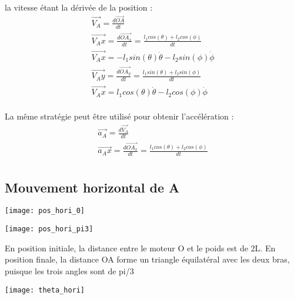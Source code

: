 \documentclass{udes_rapport} %
\begin{document}
la vitesse étant la dérivée de la position :
\begin{align}
\overrightarrow{V_A} = \frac{d\overrightarrow{OA}}{dt}	\\
\overrightarrow{V_Ax} = \frac{d\overrightarrow{OA_x}}{dt} = \frac{l_1 cos(\theta) + l_2 cos(\phi)}{dt}	\\
\overrightarrow{V_Ax} = -l_1 sin(\theta) \dot{\theta} -l_2 sin(\phi) \dot{\phi}\\
\overrightarrow{V_Ay} = \frac{d\overrightarrow{OA_y}}{dt} = \frac{l_1 sin(\theta) + l_2 sin(\phi)}{dt}	\\
\overrightarrow{V_Ax} = l_1 cos(\theta) \dot{\theta} -l_2 cos(\phi) \dot{\phi}\\
\end{align}

La même stratégie peut être utilisé pour obtenir l'accélération :
\begin{align}
\overrightarrow{a_A} = \frac{d\overrightarrow{V_A}}{dt}	\\
\overrightarrow{a_Ax} = \frac{d\overrightarrow{OA_x}}{dt} = \frac{l_1 cos(\theta) + l_2 cos(\phi)}{dt}	\\
\end{align}

\subsection{Mouvement horizontal de A}

\noindent\begin{minipage}{\textwidth} 
\begin{minipage}{0.5\textwidth}
  \centering
  \texttt{[image: pos\_hori\_0]}
  \label{pos_hori:position_horizontal_initiale}
\end{minipage}%
\begin{minipage}{0.5\textwidth}
  \centering 
  \texttt{[image: pos\_hori\_pi3]} 
  \label{pos_hori:position_horizontal_finale} 
\end{minipage} 
\label{pos_hori} 
\end{minipage}

En position initiale, la distance entre le moteur O et le poids est de 2L. 
En position finale, la distance OA forme un triangle équilatéral avec les deux bras, puisque les trois
angles sont de pi/3

\begin{center}
	\centering
	\texttt{[image: theta\_hori]}
	\label{composantes_horizontale_theta}
\end{center}
\end{document}

